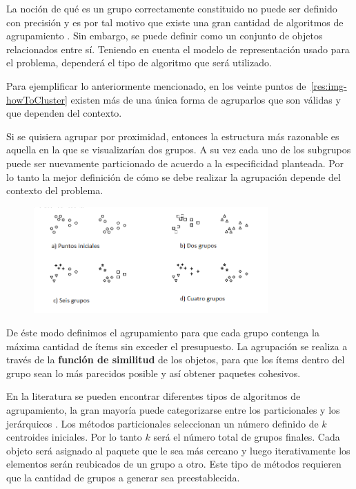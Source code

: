 La noción de qué es un grupo correctamente constituido no puede ser definido con precisión y es por tal motivo que existe una gran cantidad de algoritmos de agrupamiento \cite{Estivill-Castro:2002:WSM:568574.568575}. Sin embargo, se puede definir como un conjunto de objetos relacionados entre sí. Teniendo en cuenta el modelo de representación usado para el problema, dependerá el tipo de algoritmo que será utilizado.

Para ejemplificar lo anteriormente mencionado, en los veinte puntos de~\autoref{res:img-howToCluster} existen más de una única forma de agruparlos que son válidas y que dependen del contexto. 

Si se quisiera agrupar por proximidad, entonces la estructura más razonable es aquella en la que se visualizarían dos grupos. A su vez cada uno de los subgrupos puede ser nuevamente particionado de acuerdo a la especificidad planteada. Por lo tanto la mejor definición de cómo se debe realizar la agrupación depende del contexto del problema.

\begin{figure}[H]
  \centering
   \includegraphics[width=0.8\textwidth]{img/howToCluster.png}
   \caption{}
   \label{res:img-howToCluster}
\end{figure}

De éste modo definimos el agrupamiento para que cada grupo contenga la máxima cantidad de ítems sin exceder el presupuesto. La agrupación se realiza a través de la \textbf{función de similitud} de los objetos, para que los ítems dentro del grupo sean lo más parecidos posible y así obtener paquetes cohesivos.

En la literatura se pueden encontrar diferentes tipos de algoritmos de agrupamiento, la gran mayoría puede categorizarse entre los particionales y los jerárquicos \cite{opac-b1087461}. Los métodos particionales seleccionan un número definido de $k$ centroides iniciales. Por lo tanto $k$ será el número total de grupos finales. Cada objeto será asignado al paquete que le sea más cercano y luego iterativamente los elementos serán reubicados de un grupo a otro. Este tipo de métodos requieren que la cantidad de grupos a generar sea preestablecida. 

